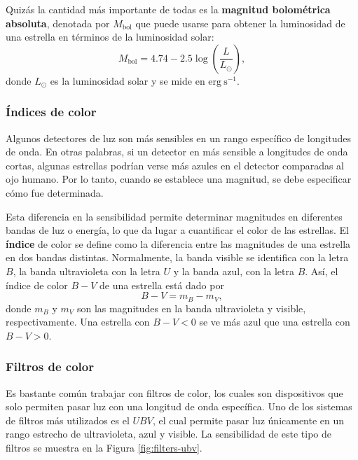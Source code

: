 Quizás la cantidad más importante de todas es la \textbf{magnitud bolométrica absoluta}, denotada por $ M_{\mathrm{bol}} $ que puede usarse para obtener la luminosidad de una estrella en términos de la luminosidad solar:
\[ M_{\mathrm{bol}} = 4.74 - 2.5\log\left( \frac{L}{L_{\odot}} \right), \]
donde $ L_{\odot} $ es la luminosidad solar y se mide en $ \mathrm{erg~s^{-1}} $.

\subsubsection{Índices de color}
Algunos detectores de luz son más sensibles en un rango específico de longitudes de onda. En otras palabras, si un detector en más sensible a longitudes de onda cortas, algunas estrellas podrían verse más azules en el detector comparadas al ojo humano. Por lo tanto, cuando se establece una magnitud, se debe especificar cómo fue determinada.

Esta diferencia en la sensibilidad permite determinar magnitudes en diferentes bandas de luz o energía, lo que da lugar a cuantificar el color de las estrellas. El \textbf{índice} de color se define como la diferencia entre las magnitudes de una estrella en dos bandas distintas. Normalmente, la banda visible se identifica con la letra $ B $, la banda ultravioleta con la letra $ U $ y la banda azul, con la letra $ B $. Así, el índice de color $ B - V $ de una estrella está dado por
\[ B - V = m_B - m_V, \]
donde $ m_B $ y $ m_V $ son las magnitudes en la banda ultravioleta y visible, respectivamente. Una estrella con $ B - V < 0 $ se ve más azul que una estrella con $ B - V > 0 $. 

\subsubsection{Filtros de color}
Es bastante común trabajar con filtros de color, los cuales son dispositivos que solo permiten  pasar luz con una longitud de onda específica. Uno de los sistemas de filtros más utilizados es el $ UBV $, el cual permite pasar luz únicamente en un rango estrecho de ultravioleta, azul y visible. La sensibilidad de este tipo de filtros se muestra en la Figura \ref{fig:filters-ubv}.

